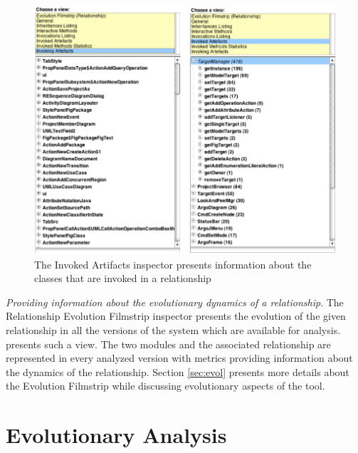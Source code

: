 \documentclass[preprint,12pt]{elsarticle}
\begin{document}
\begin{description}
\begin{figure}[h]
\begin{center}
\includegraphics[width=\linewidth]{DetailsForEdge}
\caption{The Invoked Artifacts inspector presents information about the classes that are invoked in a relationship} 
\end{center}
\end{figure}



\item {\em Providing information about the evolutionary dynamics of a relationship}. The Relationship Evolution Filmstrip inspector presents the evolution of the given relationship in all the versions of the system which are available for analysis.  presents such a view. The two modules and the associated relationship are represented in every analyzed version with metrics providing information about the dynamics of the relationship. Section \ref{sec:evol} presents more details about the Evolution Filmstrip while discussing evolutionary aspects of the tool.

\end{description}




\section {Evolutionary Analysis} 
\end{document}
